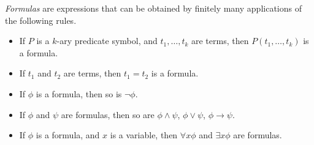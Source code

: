 

\setcounter{section}{1}
\setcounter{subsection}{1}
\setcounter{dfn}{2}

\begin{dfn}
\emph{Formulas} are expressions that can be obtained by finitely many applications of the following rules.
\begin{itemize}
\item
If $P$ is a $k$-ary predicate symbol, and $t_1, \ldots, t_k$ are terms, then $P(t_1, \ldots, t_k)$ is a formula.
\item
If $t_1$ and $t_2$ are terms, then $t_1 = t_2$ is a formula.
\item
If $\phi$ is a formula, then so is $\neg \phi$.
\item
If $\phi$ and $\psi$ are formulas, then so are $\phi \wedge \psi$, $\phi \vee \psi$, $\phi \to \psi$.
\item
If $\phi$ is a formula, and $x$ is a variable, then $\forall x \phi$ and $\exists x \phi$ are formulas.
\end{itemize}
\end{dfn}


